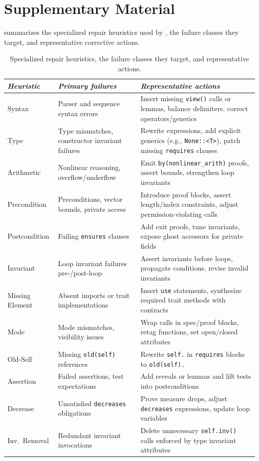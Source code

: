 \section{Supplementary Material}
\label{appendix:supp}

 summarizes the specialized repair heuristics used by \toolname{}, the failure classes they target, and representative corrective actions.

\begin{table}[h]
  \caption{Specialized repair heuristics, the failure classes they target, and representative actions.}
  \label{tab:repair-heuristics}
  \begin{small}
  \begin{tabular}{p{}p{}p{}}
    \hline
    \textit{Heuristic} & \textit{Primary failures} & \textit{Representative actions} \\
    \hline
    Syntax & Parser and sequence syntax errors & Insert missing \texttt{view()} calls or lemmas, balance delimiters, correct operators/generics \\
    Type & Type mismatches, constructor invariant failures & Rewrite expressions, add explicit generics (e.g., \texttt{None::<T>}), patch missing \texttt{requires} clauses \\
    Arithmetic & Nonlinear reasoning, overflow/underflow & Emit \texttt{by(nonlinear\_arith)} proofs, assert bounds, strengthen loop invariants \\
    Precondition & Preconditions, vector bounds, private access & Introduce proof blocks, assert length/index constraints, adjust permission-violating calls \\
    Postcondition & Failing \texttt{ensures} clauses & Add exit proofs, tune invariants, expose ghost accessors for private fields \\
    Invariant & Loop invariant failures pre-/post-loop & Assert invariants before loops, propagate conditions, revise invalid invariants \\
    Missing Element & Absent imports or trait implementations & Insert \texttt{use} statements, synthesize required trait methods with contracts \\
    Mode & Mode mismatches, visibility issues & Wrap calls in spec/proof blocks, retag functions, set open/closed attributes \\
    Old-Self & Missing \texttt{old(self)} references & Rewrite \texttt{self.} in \texttt{requires} blocks to \texttt{old(self).} \\
    Assertion & Failed assertions, test expectations & Add reveals or lemmas and lift tests into postconditions \\
    Decrease & Unsatisfied \texttt{decreases} obligations & Prove measure drops, adjust \texttt{decreases} expressions, update loop variables \\
    Inv.\ Removal & Redundant invariant invocations & Delete unnecessary \texttt{self.inv()} calls enforced by type invariant attributes \\
    \hline
  \end{tabular}
  \end{small}
\end{table}
